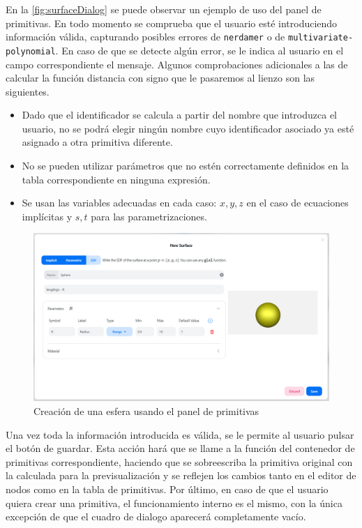En la \autoref{fig:surfaceDialog} se puede observar un ejemplo de uso del panel de primitivas. En todo momento se comprueba que el usuario esté introduciendo información válida, capturando posibles errores de \texttt{nerdamer} o de \texttt{multivariate-polynomial}. En caso de que se detecte algún error, se le indica al usuario en el campo correspondiente el mensaje. Algunos comprobaciones adicionales a las de calcular la función distancia con signo que le pasaremos al lienzo son las siguientes.
\begin{itemize}
    \item Dado que el identificador se calcula a partir del nombre que introduzca el usuario, no se podrá elegir ningún nombre cuyo identificador asociado ya esté asignado a otra primitiva diferente.
    \item No se pueden utilizar parámetros que no estén correctamente definidos en la tabla correspondiente en ninguna expresión.
    \item Se usan las variables adecuadas en cada caso: $x,y,z$ en el caso de ecuaciones implícitas y $s,t$ para las parametrizaciones. 
\end{itemize}
\begin{figure}[ht!]
    \centering
    \includegraphics[width=\textwidth]{Plantilla-TFG-master/img/surfaceDialog.png}
    \caption{Creación de una esfera usando el panel de primitivas}
    \label{fig:surfaceDialog}
\end{figure}

Una vez toda la información introducida es válida, se le permite al usuario pulsar el botón de guardar. Esta acción hará que se llame a la función del contenedor de primitivas correspondiente, haciendo que se sobreescriba la primitiva original con la calculada para la previsualización y se reflejen los cambios tanto en el editor de nodos como en la tabla de primitivas. Por último, en caso de que el usuario quiera crear una primitiva, el funcionamiento interno es el mismo, con la única excepción de que el cuadro de dialogo aparecerá completamente vacío.

